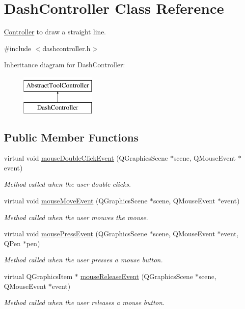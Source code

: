 \hypertarget{classDashController}{}\section{Dash\+Controller Class Reference}
\label{classDashController}


\hyperlink{classController}{Controller} to draw a straight line.  




{\ttfamily \#include $<$dashcontroller.\+h$>$}

Inheritance diagram for Dash\+Controller\+:\begin{figure}[H]
\begin{center}
\leavevmode
\includegraphics[height=2.000000cm]{classDashController}
\end{center}
\end{figure}
\subsection*{Public Member Functions}
\begin{DoxyCompactItemize}
\item 
virtual void \hyperlink{classDashController_ab9e34573a8bb26a022da0de26deaf72d}{mouse\+Double\+Click\+Event} (Q\+Graphics\+Scene $\ast$scene, Q\+Mouse\+Event $\ast$event)
\begin{DoxyCompactList}\small\item\em Method called when the user double clicks. \end{DoxyCompactList}\item 
virtual void \hyperlink{classDashController_aa958f7327cc2ec09b273144ddef71b7a}{mouse\+Move\+Event} (Q\+Graphics\+Scene $\ast$scene, Q\+Mouse\+Event $\ast$event)
\begin{DoxyCompactList}\small\item\em Method called when the user mouves the mouse. \end{DoxyCompactList}\item 
virtual void \hyperlink{classDashController_a6295b39caa176d1a12bb999ea5c120fc}{mouse\+Press\+Event} (Q\+Graphics\+Scene $\ast$scene, Q\+Mouse\+Event $\ast$event, Q\+Pen $\ast$pen)
\begin{DoxyCompactList}\small\item\em Method called when the user presses a mouse button. \end{DoxyCompactList}\item 
virtual Q\+Graphics\+Item $\ast$ \hyperlink{classDashController_a6aa7c1cefb601814f464eb902f03f698}{mouse\+Release\+Event} (Q\+Graphics\+Scene $\ast$scene, Q\+Mouse\+Event $\ast$event)
\begin{DoxyCompactList}\small\item\em Method called when the user releases a mouse button. \end{DoxyCompactList}\end{DoxyCompactItemize}
